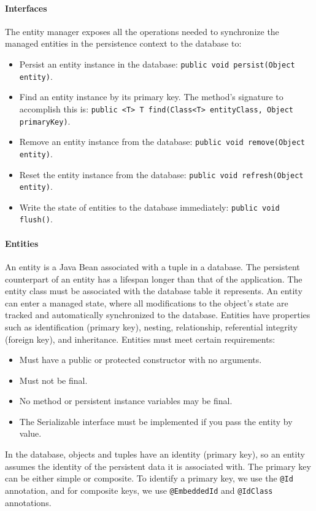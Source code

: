 \paragraph*{Interfaces}
The entity manager exposes all the operations needed to synchronize the managed entities in the persistence context to the database to:
\begin{itemize}
    \item Persist an entity instance in the database: \texttt{public void persist(Object entity)}.
    \item Find an entity instance by its primary key. 
        The method's signature to accomplish this is: \texttt{public <T> T find(Class<T> entityClass, Object primaryKey)}.
    \item Remove an entity instance from the database: \texttt{public void remove(Object entity)}.
    \item Reset the entity instance from the database: \texttt{public void refresh(Object entity)}.
    \item Write the state of entities to the database immediately: \texttt{public void flush()}.
\end{itemize}

\paragraph*{Entities}
An entity is a Java Bean associated with a tuple in a database. 
The persistent counterpart of an entity has a lifespan longer than that of the application.
The entity class must be associated with the database table it represents. 
An entity can enter a managed state, where all modifications to the object's state are tracked and automatically synchronized to the database.
Entities have properties such as identification (primary key), nesting, relationship, referential integrity (foreign key), and inheritance. 
Entities must meet certain requirements:
\begin{itemize}
    \item Must have a public or protected constructor with no arguments.
    \item Must not be final.
    \item No method or persistent instance variables may be final.
    \item The Serializable interface must be implemented if you pass the entity by value.
\end{itemize}
In the database, objects and tuples have an identity (primary key), so an entity assumes the identity of the persistent data it is associated with.
The primary key can be either simple or composite. 
To identify a primary key, we use the \texttt{@Id} annotation, and for composite keys, we use \texttt{@EmbeddedId} and \texttt{@IdClass} annotations.


